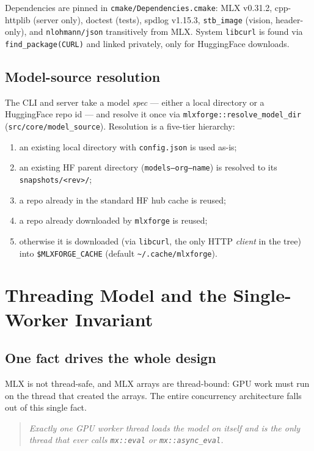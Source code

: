 \documentclass[11pt,a4paper]{report}
\newcommand{\code}[1]{\texttt{#1}}
\begin{document}
Dependencies are pinned in \code{cmake/Dependencies.cmake}: MLX v0.31.2,
cpp-httplib (server only), doctest (tests), spdlog v1.15.3, \code{stb\_image}
(vision, header-only), and \code{nlohmann/json} transitively from MLX. System
\code{libcurl} is found via \code{find\_package(CURL)} and linked privately, only
for HuggingFace downloads.

\section{Model-source resolution}
The CLI and server take a model \emph{spec} --- either a local directory or a
HuggingFace repo id --- and resolve it once via
\code{mlxforge::resolve\_model\_dir} (\code{src/core/model\_source}). Resolution is
a five-tier hierarchy:
\begin{enumerate}[nosep]
  \item an existing local directory with \code{config.json} is used as-is;
  \item an existing HF parent directory (\code{models--org--name}) is resolved to
        its \code{snapshots/<rev>/};
  \item a repo already in the standard HF hub cache is reused;
  \item a repo already downloaded by \code{mlxforge} is reused;
  \item otherwise it is downloaded (via \code{libcurl}, the only HTTP \emph{client}
        in the tree) into \code{\$MLXFORGE\_CACHE} (default
        \code{\textasciitilde/.cache/mlxforge}).
\end{enumerate}

\chapter{Threading Model and the Single-Worker Invariant}
\label{ch:threading}

\section{One fact drives the whole design}
MLX is not thread-safe, and MLX arrays are thread-bound: GPU work must run on the
thread that created the arrays. The entire concurrency architecture falls out of
this single fact.

\begin{quote}
\emph{Exactly one GPU worker thread loads the model on itself and is the only
thread that ever calls \code{mx::eval} or \code{mx::async\_eval}.}
\end{quote}
\end{document}
